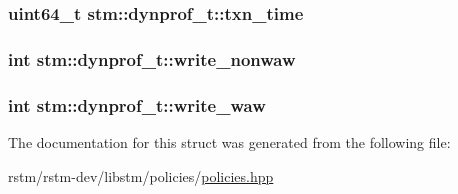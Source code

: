 \hypertarget{structstm_1_1dynprof__t_ac21d53f32c09ea9a58cd389d7cf7f102}{
\subsubsection[{txn\-\_\-time}]{\setlength{\rightskip}{0pt plus 5cm}uint64\-\_\-t stm\-::dynprof\-\_\-t\-::txn\-\_\-time}}\label{structstm_1_1dynprof__t_ac21d53f32c09ea9a58cd389d7cf7f102}
\hypertarget{structstm_1_1dynprof__t_aa8824b4a711da2929d1065d7f7f005fa}{
\subsubsection[{write\-\_\-nonwaw}]{\setlength{\rightskip}{0pt plus 5cm}int stm\-::dynprof\-\_\-t\-::write\-\_\-nonwaw}}\label{structstm_1_1dynprof__t_aa8824b4a711da2929d1065d7f7f005fa}
\hypertarget{structstm_1_1dynprof__t_a9365e2a5faf3ac711df3ea74c522d5db}{
\subsubsection[{write\-\_\-waw}]{\setlength{\rightskip}{0pt plus 5cm}int stm\-::dynprof\-\_\-t\-::write\-\_\-waw}}\label{structstm_1_1dynprof__t_a9365e2a5faf3ac711df3ea74c522d5db}


The documentation for this struct was generated from the following file\-:\begin{DoxyCompactItemize}
\item 
rstm/rstm-\/dev/libstm/policies/\hyperlink{policies_8hpp}{policies.\-hpp}\end{DoxyCompactItemize}
